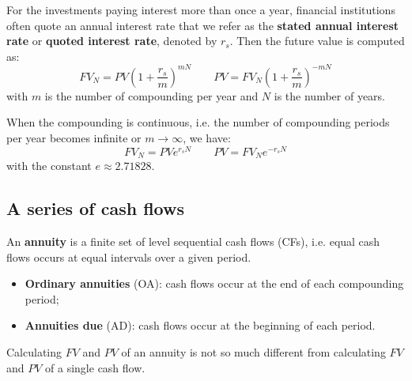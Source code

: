 For the investments paying interest more than once a year, financial institutions often quote an annual interest rate that we refer as the \textbf{stated annual interest rate} or \textbf{quoted interest rate}, denoted by $r_s$. Then the future value is computed as:
\begin{equation}
	FV_{N} = PV \left( 1 + \frac{r_s}{m} \right)^{mN} \quad\quad PV = FV_{N} \left( 1 + \frac{r_s}{m} \right)^{-mN}
\end{equation}
with $m$ is the number of compounding per year and $N$ is the number of years. 

When the compounding is continuous, i.e. the number of compounding periods per year becomes infinite or $m \rightarrow \infty$, we have:
\begin{equation}
	FV_{N} = PV e^{r_s N} \quad\quad PV = FV_{N} e^{-r_s N}
\end{equation}
with the constant $e \approx 2.71828$.


\subsection{A series of cash flows}
An \textbf{annuity} is a finite set of level sequential cash flows (CFs), i.e. equal cash flows occurs at equal intervals over a given period. 
\begin{itemize}
	\setlength\itemsep{0em}
	\item \textbf{Ordinary annuities} (OA): cash flows occur at the end of each compounding period;
	\item \textbf{Annuities due} (AD): cash flows occur at the beginning of each period. 
\end{itemize}
Calculating $FV$ and $PV$ of an annuity is not so much different from calculating $FV$ and $PV$ of a single cash flow. 

